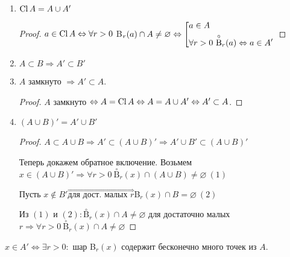 \begin{proper}
    \begin{enumerate}
        \item $\operatorname{Cl} A= A\cup A'$
        \begin{proof}
            $a\in \operatorname{Cl} A\Leftrightarrow \forall r> 0$ B$_r(a)\cap A\neq\varnothing\Leftrightarrow\left[\begin{gathered}
                                                                                                          a\in A \hfill \\
                                                                                                          \forall r > 0\ \overset{\circ}{\text{B}} _r(a)\Leftrightarrow a\in A'
            \end{gathered}\right.$
        \end{proof}
        \item $A\subset B\Rightarrow A'\subset B'$
        \item $A$ замкнуто $\Rightarrow A'\subset A$.

        \begin{proof}
            $A$ замкнуто $\Leftrightarrow A=\operatorname{Cl} A\Leftrightarrow A=A\cup A'\Leftrightarrow A'\subset A$.
        \end{proof}
        \item $(A\cup B)'=A'\cup B'$
        \begin{proof}
            $A\subset A\cup B\Rightarrow A'\subset (A\cup B)'\Rightarrow A'\cup B'\subset (A\cup B)'$

            Теперь докажем обратное включение. Возьмем $x\in (A\cup B)'\Rightarrow \forall r>0\ \overset{\circ}{\text{B}}_r(x)\cap (A\cup B)\neq \varnothing\ (1)$

            Пусть $x\notin B'\overset{\Rightarrow}{\text{для дост. малых } r}$B$_r(x)\cap B=\varnothing\ (2)$

            Из $(1)$ и $(2):\overset{\circ}{\text{B}}_r(x)\cap A\neq \varnothing$ для достаточно малых $r\Rightarrow\forall r>0\ \overset{\circ}{\text{B}}_r(x)\cap A\neq \varnothing$
        \end{proof}
    \end{enumerate}
\end{proper}

\begin{theorem}
    $x\in A'\Leftrightarrow\exists r>0:$ шар B$_r(x)$ содержит бесконечно много точек из $A$.
\end{theorem}

